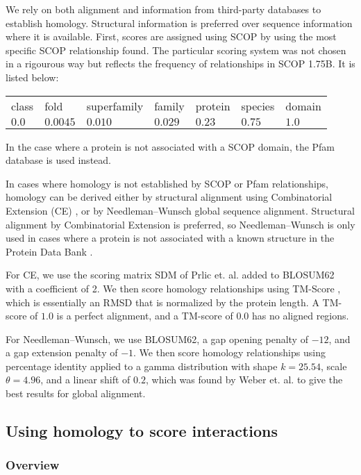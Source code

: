 \documentclass[12pt,twoside]{article}
\begin{document}
We rely on both alignment and information from third-party databases to establish homology. Structural information is preferred over sequence information where it is available. First, scores are assigned using SCOP by using the most specific SCOP relationship found. The particular scoring system was not chosen in a rigourous way but reflects the frequency of relationships in SCOP 1.75B. It is listed below:

\begin{tabular}{lllllll}
class & fold & superfamily & family & protein & species & domain \\
$0.0$ & $0.0045$ & $0.010$ & $0.029$ & $0.23$ & $0.75$ & $1.0$\\
\end{tabular}

In the case where a protein is not associated with a SCOP domain, the Pfam database is used instead.

In cases where homology is not established by SCOP \cite{scop} or Pfam relationships, homology can be derived either by structural alignment using Combinatorial Extension (CE) \cite{ce}, or by Needleman--Wunsch \cite{needleman} global sequence alignment. Structural alignment by Combinatorial Extension is preferred, so Needleman--Wunsch is only used in cases where a protein is not associated with a known structure in the Protein Data Bank \cite{pdb}.

For CE, we use the scoring matrix SDM of Prlic et. al. \cite{prlic} added to BLOSUM62 \cite{blosum} with a coefficient of 2. We then score homology relationships using TM-Score \cite{zhang}, which is essentially an RMSD that is normalized by the protein length. A TM-score of $1.0$ is a perfect alignment, and a TM-score of $0.0$ has no aligned regions.

For Needleman--Wunsch, we use BLOSUM62, a gap opening penalty of $-12$, and a gap extension penalty of $-1$. We then score homology relationships using percentage identity applied to a gamma distribution with shape $k=25.54$, scale $\theta=4.96$, and a linear shift of $0.2$, which was found by Weber et. al. \cite{webber} to give the best results for global alignment.

\subsection{Using homology to score interactions}

\subsubsection{Overview}
\end{document}
